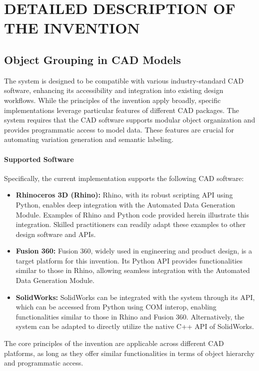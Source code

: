 \documentclass[12pt]{article}
\begin{document}
\section{DETAILED DESCRIPTION OF THE INVENTION}


\subsection{Object Grouping in CAD Models}

The system is designed to be compatible with various industry-standard CAD software, enhancing its accessibility and integration into existing design workflows. While the principles of the invention apply broadly, specific implementations leverage particular features of different CAD packages. The system requires that the CAD software supports modular object organization and provides programmatic access to model data. These features are crucial for automating variation generation and semantic labeling.

\paragraph{Supported Software}
Specifically, the current implementation supports the following CAD software:

\begin{itemize}
    \item \textbf{Rhinoceros 3D (Rhino):} Rhino, with its robust scripting API using Python, enables deep integration with the Automated Data Generation Module. Examples of Rhino and Python code provided herein illustrate this integration. Skilled practitioners can readily adapt these examples to other design software and APIs.
    \item \textbf{Fusion 360:} Fusion 360, widely used in engineering and product design, is a target platform for this invention. Its Python API provides functionalities similar to those in Rhino, allowing seamless integration with the Automated Data Generation Module.
    \item \textbf{SolidWorks:} SolidWorks can be integrated with the system through its API, which can be accessed from Python using COM interop, enabling functionalities similar to those in Rhino and Fusion 360. Alternatively, the system can be adapted to directly utilize the native C++ API of SolidWorks.
\end{itemize}

The core principles of the invention are applicable across different CAD platforms, as long as they offer similar functionalities in terms of object hierarchy and programmatic access.
\end{document}
